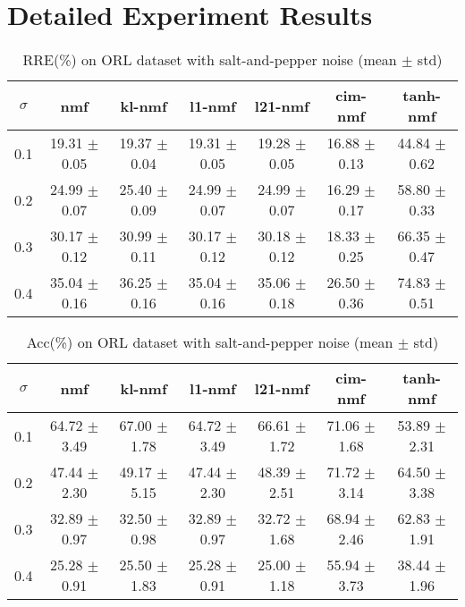 \documentclass{article} %
\begin{document}
\section{Detailed Experiment Results}

\begin{table}
\begin{tabular}{c|cccccc}$\sigma$ & nmf & kl-nmf & l1-nmf & l21-nmf & cim-nmf & tanh-nmf \\\hline
0.1 & 19.31 $\pm$ 0.05 & 19.37 $\pm$ 0.04 & 19.31 $\pm$ 0.05 & 19.28 $\pm$ 0.05 & 16.88 $\pm$ 0.13 & 44.84 $\pm$ 0.62 \\
0.2 & 24.99 $\pm$ 0.07 & 25.40 $\pm$ 0.09 & 24.99 $\pm$ 0.07 & 24.99 $\pm$ 0.07 & 16.29 $\pm$ 0.17 & 58.80 $\pm$ 0.33 \\
0.3 & 30.17 $\pm$ 0.12 & 30.99 $\pm$ 0.11 & 30.17 $\pm$ 0.12 & 30.18 $\pm$ 0.12 & 18.33 $\pm$ 0.25 & 66.35 $\pm$ 0.47 \\
0.4 & 35.04 $\pm$ 0.16 & 36.25 $\pm$ 0.16 & 35.04 $\pm$ 0.16 & 35.06 $\pm$ 0.18 & 26.50 $\pm$ 0.36 & 74.83 $\pm$ 0.51 \\
\end{tabular}\caption{
  RRE(\%) on ORL dataset with salt-and-pepper noise (mean $\pm$ std)
  \label{tab:RRE-ORL-salt-and-pepper}
}\end{table}
\begin{table}
\begin{tabular}{c|cccccc}$\sigma$ & nmf & kl-nmf & l1-nmf & l21-nmf & cim-nmf & tanh-nmf \\\hline
0.1 & 64.72 $\pm$ 3.49 & 67.00 $\pm$ 1.78 & 64.72 $\pm$ 3.49 & 66.61 $\pm$ 1.72 & 71.06 $\pm$ 1.68 & 53.89 $\pm$ 2.31 \\
0.2 & 47.44 $\pm$ 2.30 & 49.17 $\pm$ 5.15 & 47.44 $\pm$ 2.30 & 48.39 $\pm$ 2.51 & 71.72 $\pm$ 3.14 & 64.50 $\pm$ 3.38 \\
0.3 & 32.89 $\pm$ 0.97 & 32.50 $\pm$ 0.98 & 32.89 $\pm$ 0.97 & 32.72 $\pm$ 1.68 & 68.94 $\pm$ 2.46 & 62.83 $\pm$ 1.91 \\
0.4 & 25.28 $\pm$ 0.91 & 25.50 $\pm$ 1.83 & 25.28 $\pm$ 0.91 & 25.00 $\pm$ 1.18 & 55.94 $\pm$ 3.73 & 38.44 $\pm$ 1.96 \\
\end{tabular}\caption{
  Acc(\%) on ORL dataset with salt-and-pepper noise (mean $\pm$ std)
  \label{tab:Acc-ORL-salt-and-pepper}
}\end{table}
\end{document}
